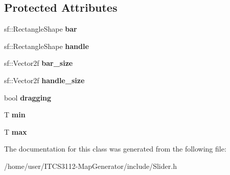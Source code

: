 \subsection*{Protected Attributes}
\begin{DoxyCompactItemize}
\item 
\mbox{\label{classSlider_a8a382801d325b47cd5b7aae5baa80da1}} 
sf\+::\+Rectangle\+Shape {\bfseries bar}
\item 
\mbox{\label{classSlider_a92f9af7e1aaddb5d47b862719d2a4540}} 
sf\+::\+Rectangle\+Shape {\bfseries handle}
\item 
\mbox{\label{classSlider_a2dac7b5a70d6024f9740528797833715}} 
sf\+::\+Vector2f {\bfseries bar\+\_\+size}
\item 
\mbox{\label{classSlider_a400435ff3fdaa8366e7686038cfa0708}} 
sf\+::\+Vector2f {\bfseries handle\+\_\+size}
\item 
\mbox{\label{classSlider_ae46779c8af98d00ddfdbe0b88dd1bcf2}} 
bool {\bfseries dragging}
\item 
\mbox{\label{classSlider_aad2d1e03b62422236829753d9e050c71}} 
T {\bfseries min}
\item 
\mbox{\label{classSlider_a9235151cf89bb12f98031fec77b7d2c3}} 
T {\bfseries max}
\end{DoxyCompactItemize}


The documentation for this class was generated from the following file\+:\begin{DoxyCompactItemize}
\item 
/home/user/\+I\+T\+C\+S3112-\/\+Map\+Generator/include/Slider.\+h\end{DoxyCompactItemize}
